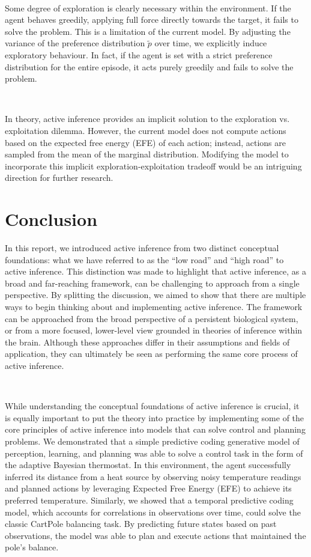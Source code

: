 \documentclass{article}
\begin{document}
\

Some degree of exploration is clearly necessary within the environment. If the agent behaves greedily, applying full force directly towards the target, it fails to solve the problem. This is a limitation of the current model. By adjusting the variance of the preference distribution $\tilde{p}$ over time, we explicitly induce exploratory behaviour. In fact, if the agent is set with a strict preference distribution for the entire episode, it acts purely greedily and fails to solve the problem.

\

In theory, active inference provides an implicit solution to the exploration vs. exploitation dilemma. However, the current model does not compute actions based on the expected free energy (EFE) of each action; instead, actions are sampled from the mean of the marginal distribution. Modifying the model to incorporate this implicit exploration-exploitation tradeoff would be an intriguing direction for further research.

\clearpage

\section{Conclusion}

In this report, we introduced active inference from two distinct conceptual foundations: what we have referred to as the ``low road'' and ``high road'' to active inference. This distinction was made to highlight that active inference, as a broad and far-reaching framework, can be challenging to approach from a single perspective. By splitting the discussion, we aimed to show that there are multiple ways to begin thinking about and implementing active inference. The framework can be approached from the broad perspective of a persistent biological system, or from a more focused, lower-level view grounded in theories of inference within the brain. Although these approaches differ in their assumptions and fields of application, they can ultimately be seen as performing the same core process of active inference.

\

While understanding the conceptual foundations of active inference is crucial, it is equally important to put the theory into practice by implementing some of the core principles of active inference into models that can solve control and planning problems. We demonstrated that a simple predictive coding generative model of perception, learning, and planning was able to solve a control task in the form of the adaptive Bayesian thermostat. In this environment, the agent successfully inferred its distance from a heat source by observing noisy temperature readings and planned actions by leveraging Expected Free Energy (EFE) to achieve its preferred temperature. Similarly, we showed that a temporal predictive coding model, which accounts for correlations in observations over time, could solve the classic CartPole balancing task. By predicting future states based on past observations, the model was able to plan and execute actions that maintained the pole's balance.
\end{document}
